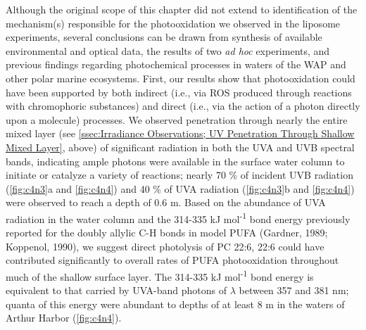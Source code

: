 Although the original scope of this chapter did not extend to identification of the mechanism(s) responsible for the photooxidation we observed in the liposome experiments, several conclusions can be drawn from synthesis of available environmental and optical data, the results of two \emph{ad hoc} experiments, and previous findings regarding photochemical processes in waters of the WAP and other polar marine ecosystems. First, our results show that photooxidation could have been supported by both indirect (i.e., via ROS produced through reactions with chromophoric substances) and direct (i.e., via the action of a photon directly upon a molecule) processes. We observed penetration through nearly the entire mixed layer (see \autoref{ssec:Irradiance Observations; UV Penetration Through Shallow Mixed Layer}, above) of significant radiation in both the UVA and UVB spectral bands, indicating ample photons were available in the surface water column to initiate or catalyze a variety of reactions; nearly 70 \% of incident UVB radiation (\autoref{fig:c4n3}a and \autoref{fig:c4n4}) and 40 \% of UVA radiation (\autoref{fig:c4n3}b and \autoref{fig:c4n4}) were observed to reach a depth of 0.6 m. Based on the abundance of UVA radiation in the water column and the 314-335 kJ mol\textsuperscript{-1} bond energy previously reported for the doubly allylic C-H bonds in model PUFA (Gardner, 1989; Koppenol, 1990), we suggest direct photolysis of PC 22:6, 22:6 could have contributed significantly to overall rates of PUFA photooxidation throughout much of the shallow surface layer. The 314-335 kJ mol\textsuperscript{-1} bond energy is equivalent to that carried by UVA-band photons of $\lambda$ between 357 and 381 nm; quanta of this energy were abundant to depths of at least 8 m in the waters of Arthur Harbor (\autoref{fig:c4n4}).

